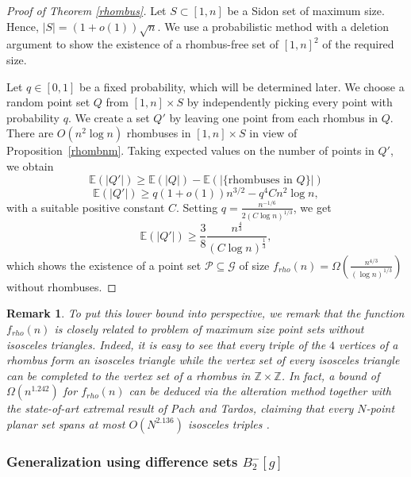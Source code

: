 \documentclass[11pt]{article}
\theoremstyle{plain}
\newtheorem{remark}[theorem]{\bf Remark}
\newcommand\cG{{\mathcal G}}
\newcommand\cP{{\mathcal P}}
\newcommand{\Z}{\mathbb{Z}}
\newcommand{\E}{\mathbb{E}}
\begin{document}
	\begin{proof}[Proof of Theorem \ref{rhombus}] Let $S\subset[1,n]$ be a Sidon set of maximum size. Hence, $|S|=(1+o(1))\sqrt{n}$.
		We use a probabilistic method with a deletion argument to show the existence of a rhombus-free set of $[1,n]^2$ of the required size. 
		
		Let $q \in [0,1]$ be a fixed probability, which will be determined later. We choose a random point set $Q$ from $[1,n]\times S$ by independently picking every point with  probability $q$. We create a set $Q'$ by leaving one point from each rhombus in $Q$. There are $O(n^2\log n)$ rhombuses in $[1,n]\times S$ in view of Proposition~\ref{rhombnm}.
		Taking expected values on the number of points in $Q'$, we obtain
		$$\E(|Q'|)\ge \E(|Q|)-\E(|\{\text{rhombuses in $Q$}\}|)$$
		$$\E(|Q'|)\ge q(1+o(1)){n^{3/2}}-q^4Cn^2\log n,$$ with a suitable positive constant $C$.
		Setting $q=\frac{n^{-1/6}}{2(C\log n)^{1/3}}$, we get
		$$\E(|Q'|)\ge \frac38\frac{n^{\frac43}}{(C\log n)^{\frac13}},$$ which shows the existence of a point set $\cP\subseteq \cG$ of size $\displaystyle f_{rho}(n)= \Omega\left(\frac{n^{4/3}}{(\log n)^{1/3}}\right)$ without rhombuses.
	\end{proof}
	\begin{remark} To put this lower bound into perspective, we remark that the function $f_{rho}(n)$ is closely related to problem of maximum size point sets without isosceles triangles. Indeed, it is easy to see that every triple of the $4$ vertices of a rhombus form an isosceles triangle while the vertex set of  every isosceles triangle can be completed to the vertex set of a rhombus in $\Z\times \Z$. In fact, a bound of $\Omega(n^{1.242})$ for $f_{rho}(n)$ can be deduced via the alteration method together with the state-of-art extremal result of Pach and Tardos, claiming that every $N$-point planar set spans at most 
		$O(N^{2.136})$ isosceles triples \cite{PT}. 
	\end{remark}
	\subsubsection{Generalization using difference sets $B_2^-[g]$}
	
\end{document}
